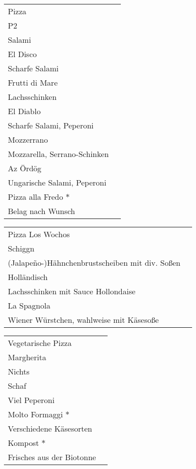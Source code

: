 \documentclass[12pt]{article}
\makeatletter
\newcommand*\ColText[1]{\textcolor{Goldenrod3}{#1}}
\newenvironment{Group}[1]
  {\noindent\begin{tabular*}{\textwidth}{@{}p{\linewidth}@{\extracolsep{\fill}}r@{}}
    {\fontsize{24}{29}\selectfont\ColText{#1}}\\[0.8em]}
  {\end{tabular*}}
\newcommand*\Entry[2]{%
  \sffamily#1 & #2}
\newcommand*\Expl[1]{%
  \hspace*{1em}\footnotesize #1}
\makeatother
\begin{document}
\vspace{1em}

\begin{Group}{Pizza}
\Entry{P2}{} \\
\Expl{Salami} \\
\Entry{El Disco}{} \\
\Expl{Scharfe Salami} \\
\Entry{Frutti di Mare}{} \\
\Expl{Lachsschinken} \\
\Entry{El Diablo}{} \\
\Expl{Scharfe Salami, Peperoni} \\
\Entry{Mozzerrano}{} \\
\Expl{Mozzarella, Serrano-Schinken} \\
\Entry{Az Ördög}{} \\ 
\Expl{Ungarische Salami, Peperoni} \\
\Entry{Pizza alla Fredo $\ast$}{} \\
\Expl{Belag nach Wunsch} \\
\end{Group}

\vspace{1em}

\begin{Group}{Pizza Los Wochos}
\Entry{Schiggn}{} \\
\Expl{(Jalape\~{n}o-)Hähnchenbrustscheiben mit div. Soßen} \\
\Entry{Holländisch}{} \\
\Expl{Lachsschinken mit Sauce Hollondaise} \\
\Entry{La Spagnola}{} \\
\Expl{Wiener Würstchen, wahlweise mit Käsesoße}
\end{Group}

\vspace{1em}

\begin{Group}{Vegetarische Pizza}
\Entry{Margherita}{} \\ 
\Expl{Nichts} \\
\Entry{Schaf}{} \\ 
\Expl{Viel Peperoni} \\
\Entry{Molto Formaggi $\ast$}{} \\ 
\Expl{Verschiedene Käsesorten} \\
\Entry{Kompost $\ast$}{} \\ 
\Expl{Frisches aus der Biotonne} \\
\end{Group}
\end{document}
